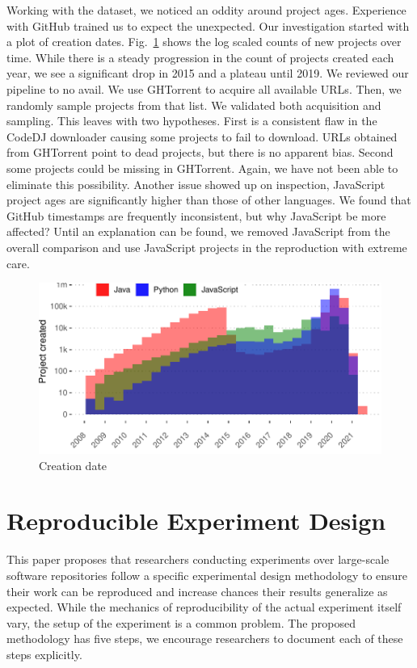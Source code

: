 \documentclass[sigconf,review,anonymous]{acmart}
\newcommand{\gh}{{GitHub}\xspace}
\newcommand{\ght}{{GHTorrent}\xspace}
\renewcommand{\dj}{{\textsf{Code{\small{DJ}}}}\xspace}
\begin{document}
Working with the dataset, we noticed an oddity around project ages. Experience
with \gh trained us to expect the unexpected. Our investigation started with a
plot of creation dates. Fig.~\ref{createdTime} shows the log scaled counts of
new projects over time. While there is a steady progression in the count of
projects created each year, we see a significant drop in 2015 and a plateau
until 2019. We reviewed our pipeline to no avail. We use \ght to acquire all
available URLs. Then, we randomly sample projects from that list. We validated
both acquisition and sampling. This leaves with two hypotheses. First is a
consistent flaw in the \dj downloader causing some projects to fail to download.
\jsProjectErrorsPct URLs obtained from \ght point to dead projects, but there is no apparent
bias. Second some projects could be missing in \ght. Again, we have not been
able to eliminate this possibility. Another issue showed up on inspection,
JavaScript project ages are significantly higher than those of other languages.
We found that \gh timestamps are frequently inconsistent, but why JavaScript be
more affected? Until an explanation can be found, we removed JavaScript from the
overall comparison and use JavaScript projects in the reproduction with extreme
care.

\begin{figure}[!h]
    \includegraphics[width=\columnwidth]{../figs/lang_projects_created}
    \caption{Creation date }\label{createdTime}
\end{figure}

\section{Reproducible Experiment Design}

This paper proposes that researchers conducting experiments over large-scale
software repositories follow a specific experimental design methodology to
ensure their work can be reproduced and increase chances their results
generalize as expected. While the mechanics of reproducibility of the actual
experiment itself vary, the setup of the experiment is a common problem. The
proposed methodology has five steps, we encourage researchers to document each
of these steps explicitly.
\end{document}
